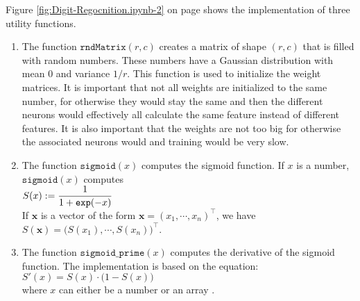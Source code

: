 Figure \ref{fig:Digit-Regocnition.ipynb-2} on page \pageref{fig:Digit-Regocnition.ipynb-2}
shows the implementation of three utility functions.
\begin{enumerate}
\item The function $\mathtt{rndMatrix}(r, c)$ creates a matrix of shape $(r, c)$ that is filled with
      random numbers.  These numbers have a Gaussian distribution with mean $0$ and variance
      $1/r$.  This function is used to initialize the weight matrices.  It is important that not all weights
      are initialized to the same number, for otherwise they would stay the same and then the different neurons
      would effectively all calculate the same feature instead of different features.  It is also important
      that the weights are not too big for otherwise the associated neurons would  and 
      training would be very slow.
\item The function $\texttt{sigmoid}(x)$ computes the sigmoid function.  If $x$ is a number,
      $\texttt{sigmoid}(x)$ computes
      \\[0.2cm]
      \hspace*{1.3cm}
      $\displaystyle S(x) := \frac{1}{1 + \texttt{exp}(-x)}$
      \\[0.2cm]
      If $\mathbf{x}$ is a vector of the form $\mathbf{x} = (x_1,\cdots, x_n)^\top$, we have
      \\[0.2cm]
      \hspace*{1.3cm}
      $S(\mathbf{x}) = \bigl(S(x_1), \cdots, S(x_n)\bigr)^\top$.
\item The function $\texttt{sigmoid\_prime}(x)$ computes the derivative of the sigmoid function.
      The implementation is based on the equation:
      \\[0.2cm]
      \hspace*{1.3cm}
      $S'(x) = S(x) \cdot \bigl(1 - S(x)\bigr)$
      \\[0.2cm]
      where $x$ can either be a number or an array
      .
\end{enumerate}

